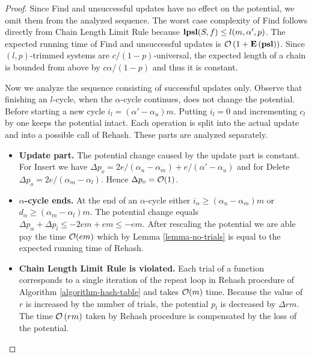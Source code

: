 \begin{proof}
Since Find and unsuccessful updates have no effect on the potential, we omit them from the analyzed sequence. 
The worst case complexity of Find follows directly from Chain Length Limit Rule because $\mathbf{lpsl}(S, f) \leq l(m, \alpha', p)$.
The expected running time of Find and unsuccessful updates is $\mathcal{O}\left(1 + \mathbf{E}\left(\mathbf{psl}\right)\right)$.
Since $(l, p)$-trimmed systems are $c/(1 - p)$-universal, the expected length of a chain is bounded from above by $c\alpha/(1 - p)$ and thus it is constant.

Now we analyze the sequence consisting of successful updates only. 
Observe that finishing an $l$-cycle, when the $\alpha$-cycle continues, does not change the potential.
Before starting a new cycle $i_l = (\alpha' - \alpha_u)m$.
Putting $i_l = 0$ and incrementing $c_l$ by one keeps the potential intact.
Each operation is split into the actual update and into a possible call of Rehash. 
These parts are analyzed separately.
\begin{itemize}
	\item \textbf{Update part.} 
The potential change caused by the update part is constant. 
For Insert we have $\Delta p_o = 2e/(\alpha_u - \alpha_m) + e/(\alpha' - \alpha_u)$ and for Delete $\Delta p_o = 2e/(\alpha_m - \alpha_l)$. 
Hence $\Delta p_o = \mathcal{O}(1)$.

	\item \textbf{$\alpha$-cycle ends.} 
At the end of an $\alpha$-cycle either $i_\alpha \geq (\alpha_u - \alpha_m)m$ or $d_\alpha \geq (\alpha_m - \alpha_l)m$. 
The potential change equals $\Delta p_\alpha + \Delta p_l \leq -2em + em \leq -em$.
After rescaling the potential we are able pay the time $\mathcal{O}(em)$ which by Lemma \ref{lemma-no-trials} is equal to the expected running time of Rehash.

	\item \textbf{Chain Length Limit Rule is violated.} 
Each trial of a function corresponds to a single iteration of the repeat loop in Rehash procedure of Algorithm \ref{algorithm-hash-table} and takes $\mathcal{O}(m)$ time. 
Because the value of $r$ is increased by the number of trials, the potential $p_l$ is decreased by $\Delta rm$. 
The time $\mathcal{O}\left(rm\right)$ taken by Rehash procedure is compensated by the loss of the potential.
\end{itemize}


\end{proof}

